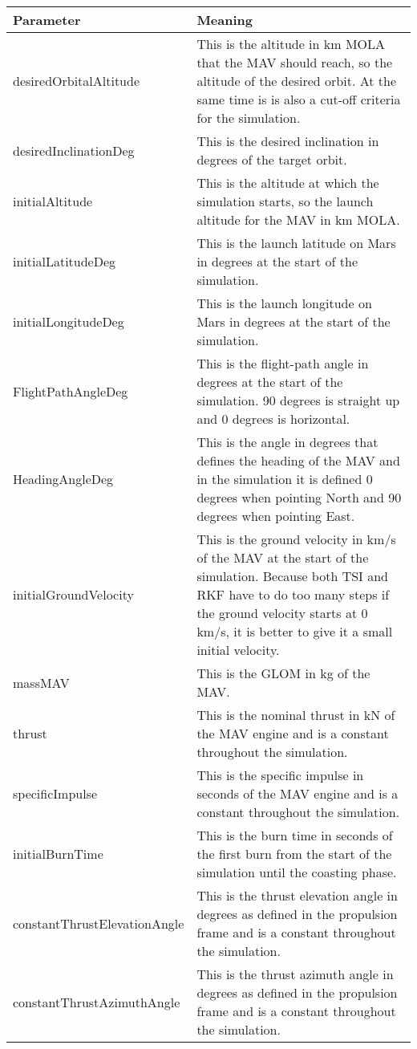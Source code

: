 \begin{longtable}{|l|p{10cm}|}
\textbf{Parameter} & \textbf{Meaning} \\ \hline 
desiredOrbitalAltitude & This is the altitude in km \ac{MOLA} that the \ac{MAV} should reach, so the altitude of the desired orbit. At the same time is is also a cut-off criteria for the simulation.  \\ \hline
desiredInclinationDeg & This is the desired inclination in degrees of the target orbit. \\ \hline
initialAltitude & This is the altitude at which the simulation starts, so the launch altitude for the \ac{MAV} in km \ac{MOLA}. \\ \hline
initialLatitudeDeg & This is the launch latitude on Mars in degrees at the start of the simulation. \\ \hline
initialLongitudeDeg & This is the launch longitude on Mars in degrees at the start of the simulation. \\ \hline
FlightPathAngleDeg & This is the flight-path angle in degrees at the start of the simulation. 90 degrees is straight up and 0 degrees is horizontal. \\ \hline
HeadingAngleDeg & This is the angle in degrees that defines the heading of the \ac{MAV} and in the simulation it is defined 0 degrees when pointing North and 90 degrees when pointing East. \\ \hline
initialGroundVelocity & This is the ground velocity in km/s of the \ac{MAV} at the start of the simulation. Because both \ac{TSI} and \ac{RKF} have to do too many steps if the ground velocity starts at 0 km/s, it is better to give it a small initial velocity.\\ \hline
massMAV & This is the \ac{GLOM} in kg of the \ac{MAV}.\\ \hline
thrust & This is the nominal thrust in kN of the \ac{MAV} engine and is a constant throughout the simulation.\\ \hline
specificImpulse & This is the specific impulse in seconds of the \ac{MAV} engine and is a constant throughout the simulation. \\ \hline
initialBurnTime & This is the burn time in seconds of the first burn from the start of the simulation until the coasting phase.\\ \hline
constantThrustElevationAngle & This is the thrust elevation angle in degrees as defined in the propulsion frame and is a constant throughout the simulation. \\ \hline
constantThrustAzimuthAngle & This is the thrust azimuth angle in degrees as defined in the propulsion frame and is a constant throughout the simulation. \\ \hline

\end{longtable}
